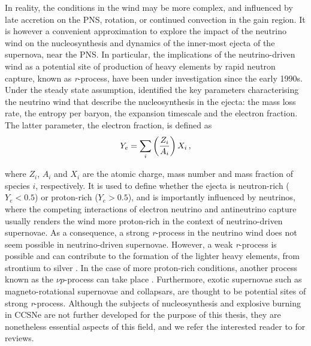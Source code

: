 In reality, the conditions in the wind may be more complex, and influenced by late accretion on the PNS, rotation, or continued convection in the gain region. It is however a convenient approximation to explore the impact of the neutrino wind on the nucleosynthesis and dynamics of the inner-most ejecta of the supernova, near the PNS. In particular, the implications of the neutrino-driven wind as a potential site of production of heavy elements by rapid neutron capture, known as \emph{r}-process, have been under investigation since the early 1990s. Under the steady state assumption, \cite{Qian1996} identified the key parameters characterising the neutrino wind that describe the nucleosynthesis in the ejecta: the mass loss rate, the entropy per baryon, the expansion timescale and the electron fraction. The latter parameter, the electron fraction, is defined as
\begin{equation}
    Y_e = \sum_i \left( \frac{Z_i}{A_i} \right) X_i \,\mathrm{,}
\end{equation}

where \(Z_i\), \(A_i\) and \(X_i\) are the atomic charge, mass number and mass fraction of species \(i\), respectively. It is used to define whether the ejecta is neutron-rich (\(Y_e < 0.5\)) or proton-rich (\(Y_e > 0.5\)), and is importantly influenced by neutrinos, where the competing interactions of electron neutrino and antineutrino capture usually renders the wind more proton-rich in the context of neutrino-driven supernovae. As a consequence, a strong \emph{r}-process in the neutrino wind does not seem possible in neutrino-driven supernovae. However, a weak \emph{r}-process is possible and can contribute to the formation of the lighter heavy elements, from strontium to silver \citep{Arcones2014}. In the case of more proton-rich conditions, another process known as the \(\nu p\)-process can take place \citep{Frohlich2006,Nevins2024}. Furthermore, exotic supernovae such as magneto-rotational supernovae and collapsars, are thought to be potential sites of strong \emph{r}-process. Although the subjects of nucleosynthesis and explosive burning in CCSNe are not further developed for the purpose of this thesis, they are nonetheless essential aspects of this field, and we refer the interested reader to \cite{Arcones2013, Boccioli2024} for reviews.
